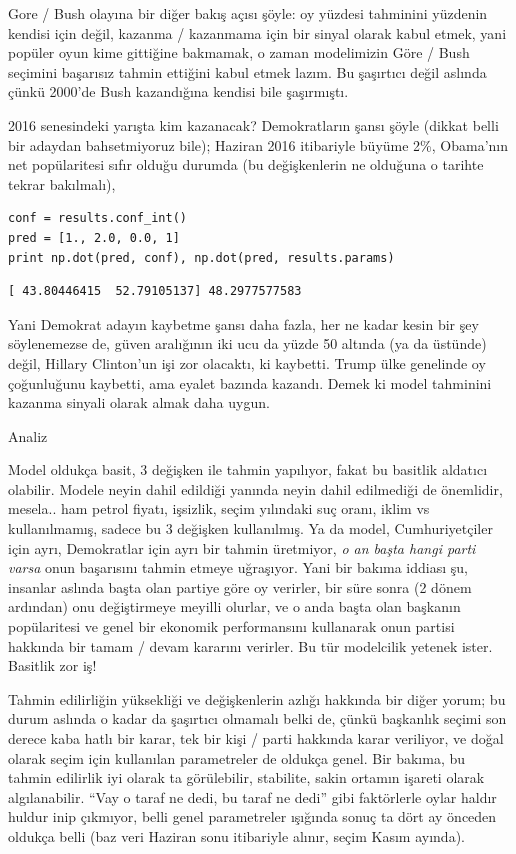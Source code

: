 \documentclass[12pt,fleqn]{article}\usepackage{../../common}
\begin{document}
Gore / Bush olayına bir diğer bakış açısı şöyle: oy yüzdesi tahminini
yüzdenin kendisi için değil, kazanma / kazanmama için bir sinyal olarak
kabul etmek, yani popüler oyun kime gittiğine bakmamak, o zaman modelimizin
Göre / Bush seçimini başarısız tahmin ettiğini kabul etmek lazım. Bu
şaşırtıcı değil aslında çünkü 2000'de Bush kazandığına kendisi bile
şaşırmıştı. 

2016 senesindeki yarışta kim kazanacak? Demokratların şansı şöyle (dikkat
belli bir adaydan bahsetmiyoruz bile); Haziran 2016 itibariyle büyüme 2\%,
Obama'nın net popülaritesi sıfır olduğu durumda (bu değişkenlerin ne
olduğuna o tarihte tekrar bakılmalı),

\begin{verbatim}
conf = results.conf_int()
pred = [1., 2.0, 0.0, 1]
print np.dot(pred, conf), np.dot(pred, results.params)
\end{verbatim}

\begin{verbatim}
[ 43.80446415  52.79105137] 48.2977577583
\end{verbatim}

Yani Demokrat adayın kaybetme şansı daha fazla, her ne kadar kesin bir şey
söylenemezse de, güven aralığının iki ucu da yüzde 50 altında (ya da
üstünde) değil, Hillary Clinton'un işi zor olacaktı, ki kaybetti. Trump
ülke genelinde oy çoğunluğunu kaybetti, ama eyalet bazında kazandı. Demek
ki model tahminini kazanma sinyali olarak almak daha uygun.

Analiz

Model oldukça basit, 3 değişken ile tahmin yapılıyor, fakat bu basitlik aldatıcı
olabilir. Modele neyin dahil edildiği yanında neyin dahil edilmediği de
önemlidir, mesela.. ham petrol fiyatı, işsizlik, seçim yılındaki suç oranı,
iklim vs kullanılmamış, sadece bu 3 değişken kullanılmış. Ya da model,
Cumhuriyetçiler için ayrı, Demokratlar için ayrı bir tahmin üretmiyor, {\em o an
  başta hangi parti varsa} onun başarısını tahmin etmeye uğraşıyor. Yani bir
bakıma iddiası şu, insanlar aslında başta olan partiye göre oy verirler, bir
süre sonra (2 dönem ardından) onu değiştirmeye meyilli olurlar, ve o anda başta
olan başkanın popülaritesi ve genel bir ekonomik performansını kullanarak onun
partisi hakkında bir tamam / devam kararını verirler. Bu tür modelcilik yetenek
ister. Basitlik zor iş!

Tahmin edilirliğin yüksekliği ve değişkenlerin azlığı hakkında bir diğer yorum;
bu durum aslında o kadar da şaşırtıcı olmamalı belki de, çünkü başkanlık seçimi
son derece kaba hatlı bir karar, tek bir kişi / parti hakkında karar veriliyor,
ve doğal olarak seçim için kullanılan parametreler de oldukça genel. Bir bakıma,
bu tahmin edilirlik iyi olarak ta görülebilir, stabilite, sakin ortamın işareti
olarak algılanabilir. ``Vay o taraf ne dedi, bu taraf ne dedi'' gibi faktörlerle
oylar haldır huldur inip çıkmıyor, belli genel parametreler ışığında sonuç ta
dört ay önceden oldukça belli (baz veri Haziran sonu itibariyle alınır, seçim
Kasım ayında).
\end{document}
